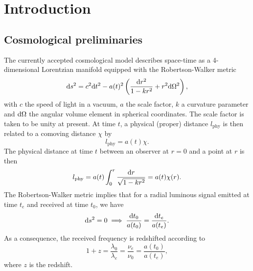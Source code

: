 \chapter{Introduction}\label{chapter:intro}


\section{Cosmological preliminaries}
The currently accepted cosmological model describes space-time as a 4-dimensional Lorentzian manifold equipped with the Robertson-Walker metric \cite{carroll}
\begin{equation}\label{eq_ch1:RW_metric}
    \differential s^2=c^2\differential t^2-a(t)^2\left( \frac{\differential r^2}{1-kr^2}+r^2 \differential \Omega^2 \right),
\end{equation}
with $c$ the speed of light in a vacuum, $a$ the scale factor, $k$ a curvature parameter and  $\differential \Omega$ the angular volume element in spherical coordinates. The scale factor is taken to be unity at present. At time $t$, a physical (proper) distance $l_\text{phy}$ is then related to a comoving distance $\chi$ by 
\begin{equation}\label{eq_ch1:phy_com_dis}
    l_\text{phy}=a(t)\chi.
\end{equation}
The physical distance at time $t$ between an observer at $r=0$ and a point at $r$ is then
\begin{equation}\label{eq_ch1:def_com_len}
    l_\text{phy}=a(t)\int_0^r \frac{\differential r}{\sqrt{1-kr^2}}=a(t)\chi(r).
\end{equation}
The Robertson-Walker metric implies that for a radial luminous signal emitted at time $t_e$ and received at time $t_0$, we have
\begin{equation}
    \differential s^2=0 \implies \frac{\differential t_0}{a(t_0)}=\frac{\differential t_e}{a(t_e)}.
\end{equation}
As a consequence, the received frequency is redshifted according to
\begin{equation}
    1+z=\frac{\lambda_0}{\lambda_e}=\frac{\nu_e}{\nu_0}=\frac{a(t_0)}{a(t_e)},
\end{equation}
where $z$ is the redshift.

